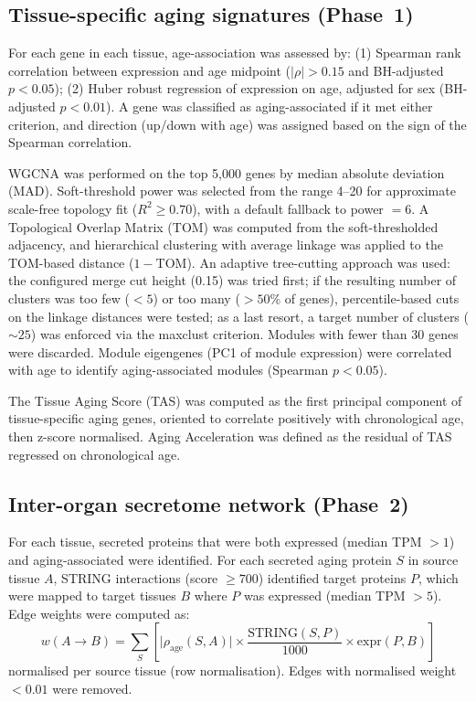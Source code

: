 \documentclass[11pt,a4paper]{article}
\begin{document}
\subsection*{Tissue-specific aging signatures (Phase~1)}

For each gene in each tissue, age-association was assessed by: (1) Spearman rank correlation between expression and age midpoint ($|\rho| > 0.15$ and BH-adjusted $p < 0.05$); (2) Huber robust regression of expression on age, adjusted for sex (BH-adjusted $p < 0.01$). A gene was classified as aging-associated if it met either criterion, and direction (up/down with age) was assigned based on the sign of the Spearman correlation.

WGCNA was performed on the top 5,000 genes by median absolute deviation (MAD). Soft-threshold power was selected from the range 4--20 for approximate scale-free topology fit ($R^2 \geq 0.70$), with a default fallback to power $= 6$. A Topological Overlap Matrix (TOM) was computed from the soft-thresholded adjacency, and hierarchical clustering with average linkage was applied to the TOM-based distance ($1 - \text{TOM}$). An adaptive tree-cutting approach was used: the configured merge cut height (0.15) was tried first; if the resulting number of clusters was too few ($< 5$) or too many ($> 50$\% of genes), percentile-based cuts on the linkage distances were tested; as a last resort, a target number of clusters (${\sim}25$) was enforced via the maxclust criterion. Modules with fewer than 30 genes were discarded. Module eigengenes (PC1 of module expression) were correlated with age to identify aging-associated modules (Spearman $p < 0.05$).

The Tissue Aging Score (TAS) was computed as the first principal component of tissue-specific aging genes, oriented to correlate positively with chronological age, then z-score normalised. Aging Acceleration was defined as the residual of TAS regressed on chronological age.

\subsection*{Inter-organ secretome network (Phase~2)}

For each tissue, secreted proteins that were both expressed (median TPM $> 1$) and aging-associated were identified. For each secreted aging protein $S$ in source tissue $A$, STRING interactions (score $\geq 700$) identified target proteins $P$, which were mapped to target tissues $B$ where $P$ was expressed (median TPM $> 5$). Edge weights were computed as:
\begin{equation}
w(A \to B) = \sum_S \left[ \lvert\rho_{\text{age}}(S, A)\rvert \times \frac{\text{STRING}(S, P)}{1000} \times \text{expr}(P, B) \right]
\label{eq:edge_weight}
\end{equation}
normalised per source tissue (row normalisation). Edges with normalised weight $< 0.01$ were removed.
\end{document}

